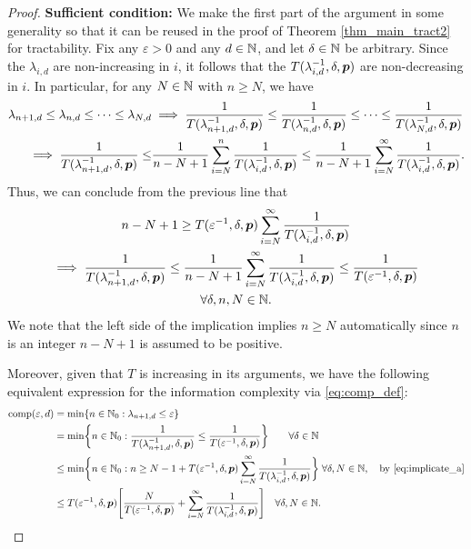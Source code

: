 \documentclass[sort&compress]{elsarticle}
\newcommand{\thed}{\delta}
\begin{document}
\begin{proof}
\textbf{Sufficient condition:}\newline
We make the first part of the argument in some generality so that it can be reused in the proof of Theorem \ref{thm_main_tract2} for tractability.  Fix any $\varepsilon > 0$ and any $d \in \mathbb{N}$, and let $\thed \in \naturals$ be arbitrary. %
Since the $\lambda_{i,d}$ are non-increasing in $i$, it follows that the $T(\lambda_{i,d}^{-1},\thed,\vp)$ are non-decreasing in $i$. In particular, for  any $N\in\mathbb{N}$ with $n\ge N$, we have
\begin{align*}
    \lambda_{n+1,d} \le \lambda_{n,d} \le \cdots \le \lambda_{N,d}
    & \implies \frac{1}{T(\lambda_{n+1, d}^{-1},\thed,\vp)} \le \frac{1}{T(\lambda_{n, d}^{-1},\thed,\vp)} \le \cdots \le \frac{1}{T(\lambda_{N, d}^{-1},\thed,\vp)} \\
     \implies \frac{1}{T(\lambda_{n+1, d}^{-1},\thed,\vp) }
    \le &\frac{1}{n-N+1} \sum_{i=N}^n  \frac{1}{T(\lambda_{i, d}^{-1},\thed,\vp) }
    \le \frac{1}{n-N+1} \sum_{i=N}^\infty  \frac{1}{T(\lambda_{i, d}^{-1},\thed,\vp)}.
\end{align*}
Thus, we can conclude from the previous line that
\begin{multline} \label{eq:implicate_a}
    n - N +1 \ge T(\varepsilon^{-1},\thed,\vp) \sum_{i=N}^\infty \frac{1}{T(\lambda_{i, d}^{-1},\thed,\vp)} \\
   \implies   \frac{1}{T(\lambda_{n+1, d}^{-1},\thed,\vp)} \le
   \frac{1}{n-N+1} \sum_{i=N}^\infty \frac{1}{T(\lambda_{i, d}^{-1},\thed,\vp) } \le \frac{1}{T(\varepsilon^{-1},\thed,\vp)} \\ \forall \thed, n, N \in \naturals.
\end{multline}
We note that the left side of the implication implies $n \ge N$ automatically since $n$ is an integer  $n - N +1$ is assumed to be positive.

Moreover, given that $T$ is increasing in its arguments, we have the following equivalent expression for the information complexity via \eqref{eq:comp_def}:
\begin{align} %
	\nonumber
	\comp(\varepsilon, d) & = \min \{n \in \natzero : \lambda_{n+1, d} \le \varepsilon\} \\
	\nonumber
	& = \min \biggl\{n \in \natzero : \frac{1}{T(\lambda_{n+1,d}^{-1},\thed,\vp)}\le \frac{1}{T(\varepsilon^{-1},\thed,\vp) }\biggr\} \qquad  \forall \thed\in \naturals\\
	\nonumber
	& \le  \min \biggl\{n \in \natzero : n \ge N - 1 + T(\varepsilon^{-1},\thed,\vp) \sum_{i=N}^\infty \frac{1}{T(\lambda_{i, d}^{-1},\thed,\vp)} \biggr\} \;  \forall  \thed, N \in \naturals, \quad \text{by \eqref{eq:implicate_a}} \\
	& \le  T(\varepsilon^{-1},\thed,\vp) \Biggl [\frac{N}{T(\varepsilon^{-1},\thed,\vp)}  +  \sum_{i=N}^\infty \frac{1}{T(\lambda_{i, d}^{-1},\thed,\vp)} \Biggr] \quad \forall  \thed, N \in \naturals. \label{eq:compUP}
\end{align}


\end{proof}
\end{document}
